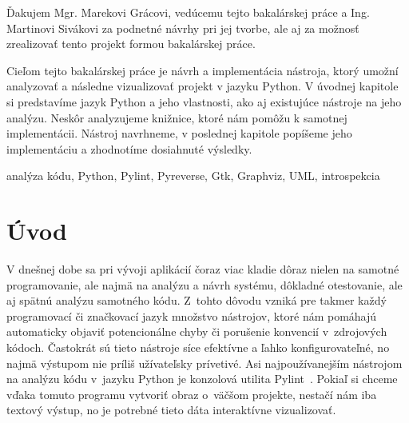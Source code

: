 \documentclass[11pt,oneside,final]{fithesis2}
\begin{document}
 \FrontMatter  
 \ThesisTitlePage

\begin{ThesisDeclaration}
\DeclarationText
\AdvisorName
\end{ThesisDeclaration}

\begin{ThesisThanks}
Ďakujem Mgr. Marekovi Grácovi, vedúcemu tejto bakalárskej práce a Ing. Martinovi Sivákovi za podnetné návrhy pri jej tvorbe, ale aj za možnosť zrealizovať tento projekt formou bakalárskej práce.
\end{ThesisThanks}

\begin{ThesisAbstract}
Cieľom tejto bakalárskej práce je návrh a implementácia nástroja, ktorý umožní analyzovať a následne vizualizovať projekt v jazyku Python. V úvodnej kapitole si predstavíme jazyk Python a jeho vlastnosti, ako aj existujúce nástroje na jeho analýzu. Neskôr analyzujeme knižnice, ktoré nám pomôžu k samotnej implementácii. Nástroj navrhneme, v poslednej kapitole popíšeme jeho implementáciu a zhodnotíme dosiahnuté výsledky.
\end{ThesisAbstract}

\begin{ThesisKeyWords}
analýza kódu, Python, Pylint, Pyreverse, Gtk, Graphviz, UML, introspekcia
\end{ThesisKeyWords}



\MainMatter  
\tableofcontents

\chapter{Úvod}

	V dnešnej dobe sa pri vývoji aplikácií čoraz viac kladie dôraz nielen na samotné programovanie, ale najmä na analýzu a návrh systému, dôkladné otestovanie, ale aj spätnú analýzu samotného kódu. Z~tohto dôvodu vzniká pre takmer každý programovací či značkovací jazyk množstvo nástrojov, ktoré nám pomáhajú automaticky objaviť potencionálne chyby či porušenie konvencií v~zdrojových kódoch. Častokrát sú tieto nástroje síce efektívne a ľahko konfigurovateľné, no najmä výstupom nie príliš užívateľsky prívetivé. Asi najpoužívanejším nástrojom na analýzu kódu v~jazyku Python je konzolová utilita Pylint~\cite{pylint}. Pokiaľ si chceme vďaka tomuto programu vytvoriť obraz o~väčšom projekte, nestačí nám iba textový výstup, no je potrebné tieto dáta interaktívne vizualizovať.
	
\end{document}
